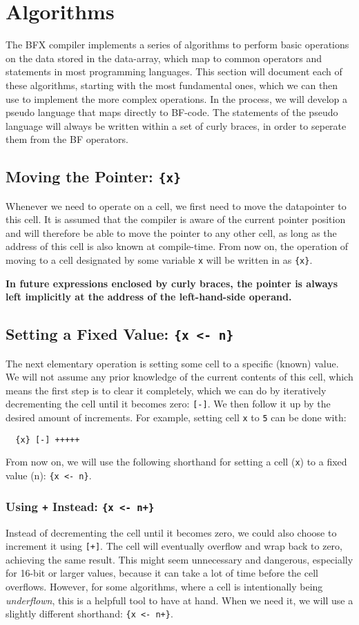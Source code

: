 \section{Algorithms}\label{section:algorithms}
The BFX compiler implements a series of algorithms to perform basic operations on the data stored in the data-array, which map to common operators and statements in most programming languages. This section will document each of these algorithms, starting with the most fundamental ones, which we can then use to implement the more complex operations. In the process, we will develop a pseudo language that maps directly to BF-code. The statements of the pseudo language will always be written within a set of curly braces, in order to seperate them from the BF operators.

\subsection{Moving the Pointer: \texttt{\{x\}}}
Whenever we need to operate on a cell, we first need to move the datapointer to this cell. It is assumed that the compiler is aware of the current pointer position and will therefore be able to move the pointer to any other cell, as long as the address of this cell is also known at compile-time. From now on, the operation of moving to a cell designated by some variable \texttt{x} will be written in as \texttt{\{x\}}.

\textbf{In future expressions enclosed by curly braces, the pointer is always left implicitly at the address of the left-hand-side operand.}

\subsection{Setting a Fixed Value: \texttt{\{x <- n\}}}
The next elementary operation is setting some cell to a specific (known) value. We will not assume any prior knowledge of the current contents of this cell, which means the first step is to clear it completely, which we can do by iteratively decrementing the cell until it becomes zero: \texttt{[-]}. We then follow it up by the desired amount of increments. For example, setting cell \texttt{x} to \texttt{5} can be done with:
\begin{lstlisting}
  {x} [-] +++++
\end{lstlisting}
From now on, we will use the following shorthand for setting a cell (\texttt{x}) to a fixed value (n): \texttt{\{x <- n\}}.
\subsubsection{Using \texttt{+} Instead: \texttt{\{x <- n+\}}}
Instead of decrementing the cell until it becomes zero, we could also choose to increment it using \texttt{[+]}. The cell will eventually overflow and wrap back to zero, achieving the same result. This might seem unnecessary and dangerous, especially for 16-bit or larger values, because it can take a lot of time before the cell overflows. However, for some algorithms, where a cell is intentionally being \emph{underflown}, this is a helpfull tool to have at hand. When we need it, we will use a slightly different shorthand: \texttt{\{x <- n+\}}.

